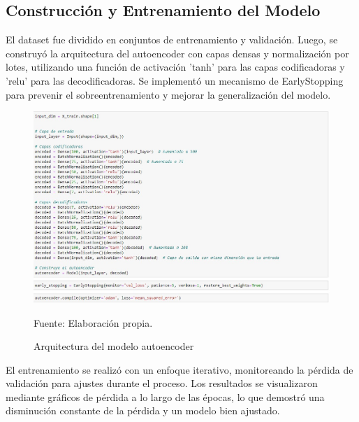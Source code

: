 \subsection{Construcción y Entrenamiento del Modelo}

El dataset fue dividido en conjuntos de entrenamiento y validación. Luego, se construyó la arquitectura del autoencoder con capas densas y normalización por lotes, utilizando una función de activación 'tanh' para las capas codificadoras y 'relu' para las decodificadoras. Se implementó un mecanismo de EarlyStopping para prevenir el sobreentrenamiento y mejorar la generalización del modelo.

\begin{figure}[H]
    \begin{minipage}[t]{0.9\textwidth}
        \caption{Arquitectura del modelo autoencoder}
        \label{arquitectura_autoencoder}        
    \end{minipage}

    \vspace{10pt}

    \begin{minipage}[b]{0.99\textwidth}
        \centering
        \includegraphics[width=\textwidth]{img/Arquitectura modelo autoencoder.jpg}        
    \end{minipage}

    \begin{minipage}[t]{0.9\textwidth}
        Fuente: Elaboración propia.
    \end{minipage}
\end{figure}

El entrenamiento se realizó con un enfoque iterativo, monitoreando la pérdida de validación para ajustes durante el proceso. Los resultados se visualizaron mediante gráficos de pérdida a lo largo de las épocas, lo que demostró una disminución constante de la pérdida y un modelo bien ajustado.

